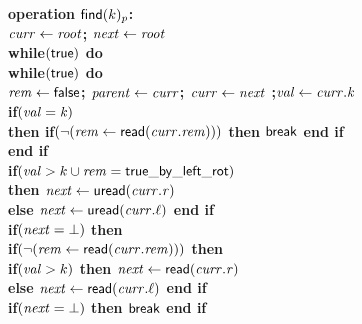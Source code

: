 \begin{figure}[h!]
{{\begin{minipage}[t]{150mm}
\begin{tabbing}
\bf{operation} $\act{find}(k)_p$: \\
		 \> $\ms{curr} \gets \ms{root}$; $\ms{next} \gets \ms{root}$ \\
		 \> \bf{while}$(\lit{true})$ \bf{do} \\
		 \>\> \bf{while}$(\lit{true})$ \bf{do} \\
		 \>\>\> $\ms{rem} \gets \lit{false}$; $\ms{parent} \gets \ms{curr}$; $\ms{curr} \gets \ms{next}$ ;$\ms{val} \gets \ms{curr.k}$ \\
		 \>\>\> \bf{if}$(\ms{val} = \ms{k})$ \\%
		 \>\>\>\> \bf{then if}$(\neg(\ms{rem} \gets \lit{read}(\ms{curr.rem})))$ {\bf then} $\lit{break}$ \bf{end if} \\%
		 \>\>\> \bf{end if} \\
		 \>\>\> \bf{if}$(\ms{val} > k \cup \ms{rem} = \lit{true\_by\_left\_rot})$ \\%
		 \>\>\>\> \bf{then} $\ms{next} \gets \lit{uread}(\ms{curr.r})$ \\%
		 \>\>\>\> \bf{else} $\ms{next} \gets \lit{uread}(\ms{curr.\ell})$ {\bf end if} \\%
		 \>\>\> \bf{if}$(\ms{next} = \bot)$ \bf{then} \\
		 \>\>\>\> \bf{if}$(\neg (\ms{rem} \gets \lit{read}(\ms{curr.rem})))$ \bf{then}\\%
		 \>\>\>\>\>\> \bf{if}$(\ms{val} > k)$ \bf{then} $\ms{next} \gets \lit{read}(\ms{curr.r})$ \\%
		 \>\>\>\>\>\>\> \bf{else} $\ms{next} \gets \lit{read}(\ms{curr.\ell})$  \bf{end if} \\%
		 \>\>\>\>\>\> \bf{if}$(\ms{next} = \bot)$ \bf{then} $\lit{break}$ \bf{end if} \\%

\end{tabbing}
\end{minipage}}}
\end{figure}
